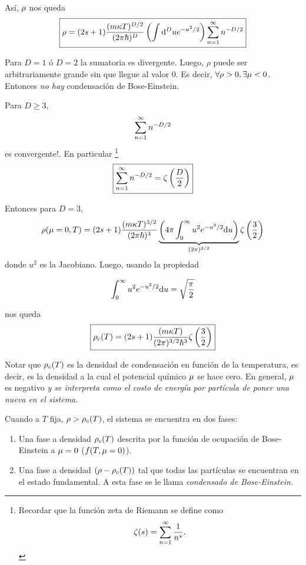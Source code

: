 Así, $\rho$ nos queda
\begin{equation}
  \boxed{\rho=(2s+1)\frac{(m\kappa T)^{D/2}}{(2\pi\hbar)^D}\left( \int\dd^D ue^{-u^2/2}\right)\sum_{n=1}^\infty n^{-D/2}}
\end{equation}

Para $D=1$ ó $D=2$ la sumatoria es divergente. Luego, $\rho$ puede ser arbitrariamente grande sin que llegue al valor $0$. Es decir, $\forall \rho >0, \exists \mu <0$. Entonces \textit{no hay} condensación de Bose-Einstein.

Para $D\geq 3$,
\begin{equation}
  \sumn1 n^{-D/2}
\end{equation}
es convergente!. En particular \footnote{Recordar que la función zeta de Riemann se define como
\begin{equation}
 \z (s)= \sumn1 \frac{1}{n^s }.\end{equation}
}
\begin{equation}
  \boxed{\sumn1 n^{-D/2}=\z \left(\frac{D}{2}\right)}
\end{equation}

Entonces para $D=3$,
\begin{align}
  \rho(\mu =0,T)=(2s+1)\frac{(m\kappa T)^{3/2}}{(2\pi\hbar)^3}\underbrace{\left(4\pi \int_0^\infty u^2e^{-u^2/2}\dd u\right)}_{(2\pi)^{3/2}}\zeta\left(\frac{3}{2}\right)
\end{align}
donde $u^2$ es la Jacobiano. Luego, usando la propiedad
\begin{prop}
	\begin{equation}
  \int_0^\infty u^2e^{-u^2/2}\dd u=\sqrt{\frac{\pi }{2	}}
\end{equation}

\end{prop}

nos queda
\begin{equation}
  \boxed{\rho_c(T)=(2s+1)\frac{(m\kappa T)}{(2\pi)^{3/2}\hbar^3}\zeta \left(\frac{3}{2}\right)}
\end{equation}

Notar que $\rho_c(T)$ es la densidad de condensación en función de la temperatura, es decir, es la densidad a la cual el potencial químico $\mu$ se hace cero. En general, $\mu$ es negativo \textit{y se interpreta como el costo de energía por partícula de poner una nueva en el sistema.}

Cuando a $T$ fija, $\rho>\rho_c(T)$, el sistema se encuentra en dos fases:
\begin{enumerate}
	\item Una fase a densidad $\rho_c(T)$ descrita por la función de ocupación de Bose-Einstein a $\mu=0$ ($f(T,\mu=0)$).
	\item Una fase a densidad $(\rho-\rho_c(T))$ tal que todas las partículas se encuentran en el estado fundamental. A esta fase se le llama \textit{condensado de Bose-Einstein.}
\end{enumerate}

